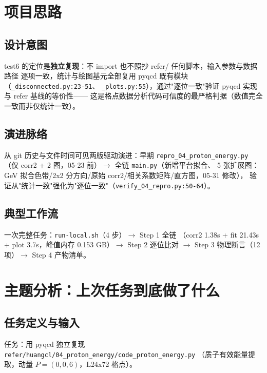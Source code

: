 \documentclass[UTF8]{ctexart}
\begin{document}
\section{项目思路}
\subsection{设计意图}
\begin{ideabox}
test6 的定位是\textbf{独立复现}：不 import 也不照抄 refer/ 任何脚本，输入参数与数据路径
逐项一致，统计与绘图基元全部复用 pyqcd 既有模块（\texttt{\nolinkurl{_disconnected.py:23-51}}、
\texttt{\nolinkurl{_plots.py:55}}），通过"逐位一致"验证 pyqcd 实现与 refer 基线的等价性——
这是格点数据分析代码可信度的最严格判据（数值完全一致而非仅统计一致）。
\end{ideabox}
\subsection{演进脉络}
从 git 历史与文件时间可见两版驱动演进：早期 \texttt{\nolinkurl{repro_04_proton_energy.py}}
（仅 corr2 + 2 图，05-23 前）$\rightarrow$ 全链 \texttt{\nolinkurl{main.py}}（新增平台拟合、
5 张扩展图：GeV 拟合色带/2x2 分方向/原始 corr2/相关系数矩阵/直方图，05-31 修改），
验证从"统计一致"强化为"逐位一致"（\texttt{\nolinkurl{verify_04_repro.py:50-64}}）。
\subsection{典型工作流}
一次完整任务：\texttt{\nolinkurl{run-local.sh}}（4 步）$\rightarrow$ Step 1 全链
（corr2 1.38s + fit 21.43s + plot 3.7s，峰值内存 0.153 GB）$\rightarrow$ Step 2 逐位比对
$\rightarrow$ Step 3 物理断言（12 项）$\rightarrow$ Step 4 产物清单。

\section{主题分析：上次任务到底做了什么}
\subsection{任务定义与输入}
任务：用 pyqcd 独立复现 \texttt{\nolinkurl{refer/huangcl/04_proton_energy/code_proton_energy.py}}
（质子有效能量提取，动量 $P=(0,0,6)$，L24x72 格点）。
\end{document}
